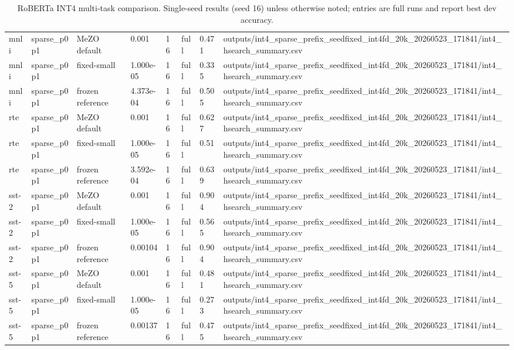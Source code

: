 \begin{table}[t]
\begin{tabular}{llllllll}
mnli & sparse\_p0p1 & MeZO default & 0.001 & 16 & full & 0.471 & outputs/int4\_sparse\_prefix\_seedfixed\_int4fd\_20k\_20260523\_171841/int4\_hsearch\_summary.csv \\
mnli & sparse\_p0p1 & fixed-small & 1.000e-05 & 16 & full & 0.335 & outputs/int4\_sparse\_prefix\_seedfixed\_int4fd\_20k\_20260523\_171841/int4\_hsearch\_summary.csv \\
mnli & sparse\_p0p1 & frozen reference & 4.373e-04 & 16 & full & 0.505 & outputs/int4\_sparse\_prefix\_seedfixed\_int4fd\_20k\_20260523\_171841/int4\_hsearch\_summary.csv \\
rte & sparse\_p0p1 & MeZO default & 0.001 & 16 & full & 0.627 & outputs/int4\_sparse\_prefix\_seedfixed\_int4fd\_20k\_20260523\_171841/int4\_hsearch\_summary.csv \\
rte & sparse\_p0p1 & fixed-small & 1.000e-05 & 16 & full & 0.51 & outputs/int4\_sparse\_prefix\_seedfixed\_int4fd\_20k\_20260523\_171841/int4\_hsearch\_summary.csv \\
rte & sparse\_p0p1 & frozen reference & 3.592e-04 & 16 & full & 0.639 & outputs/int4\_sparse\_prefix\_seedfixed\_int4fd\_20k\_20260523\_171841/int4\_hsearch\_summary.csv \\
sst-2 & sparse\_p0p1 & MeZO default & 0.001 & 16 & full & 0.904 & outputs/int4\_sparse\_prefix\_seedfixed\_int4fd\_20k\_20260523\_171841/int4\_hsearch\_summary.csv \\
sst-2 & sparse\_p0p1 & fixed-small & 1.000e-05 & 16 & full & 0.565 & outputs/int4\_sparse\_prefix\_seedfixed\_int4fd\_20k\_20260523\_171841/int4\_hsearch\_summary.csv \\
sst-2 & sparse\_p0p1 & frozen reference & 0.00104 & 16 & full & 0.904 & outputs/int4\_sparse\_prefix\_seedfixed\_int4fd\_20k\_20260523\_171841/int4\_hsearch\_summary.csv \\
sst-5 & sparse\_p0p1 & MeZO default & 0.001 & 16 & full & 0.481 & outputs/int4\_sparse\_prefix\_seedfixed\_int4fd\_20k\_20260523\_171841/int4\_hsearch\_summary.csv \\
sst-5 & sparse\_p0p1 & fixed-small & 1.000e-05 & 16 & full & 0.273 & outputs/int4\_sparse\_prefix\_seedfixed\_int4fd\_20k\_20260523\_171841/int4\_hsearch\_summary.csv \\
sst-5 & sparse\_p0p1 & frozen reference & 0.00137 & 16 & full & 0.475 & outputs/int4\_sparse\_prefix\_seedfixed\_int4fd\_20k\_20260523\_171841/int4\_hsearch\_summary.csv \\
\bottomrule
\end{tabular}
\caption{RoBERTa INT4 multi-task comparison. Single-seed results (seed 16) unless otherwise noted; entries are full runs and report best dev accuracy.}
\label{tab:roberta_multitask_main}
\end{table}
